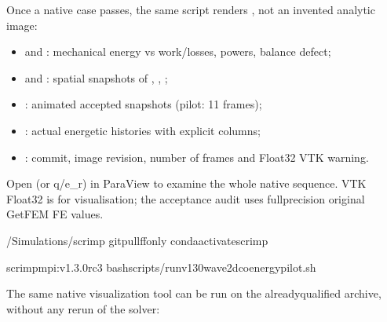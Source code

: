 \documentclass[letterpaper,10pt,english]{sphinxmanual}
\begin{document}
\sphinxAtStartPar
Once a native case passes, the same script renders
, not an invented
analytic image:
\begin{itemize}
\item {} 
\sphinxAtStartPar
{} and :
mechanical energy vs work/losses, powers, balance defect;

\item {} 
\sphinxAtStartPar
{} and :
spatial snapshots of , , ;

\item {} 
\sphinxAtStartPar
{}: animated accepted 
snapshots (pilot: 11 frames);

\item {} 
\sphinxAtStartPar
{}: actual energetic
histories with explicit columns;

\item {} 
\sphinxAtStartPar
{}: commit, image revision,
number of frames and Float32 VTK warning.

\end{itemize}

\sphinxAtStartPar
Open  (or q/e\_r) in
ParaView to examine the whole native sequence. VTK
Float32 is for visualisation; the acceptance audit
uses full\sphinxhyphen{}precision original GetFEM FE values.

\begin{sphinxVerbatim}[commandchars=\\\{\}]
\PYGZti{}/Simulations/scrimp
gitpull\PYGZhy{}\PYGZhy{}ff\PYGZhy{}only
condaactivatescrimp

scrimp\PYGZhy{}mpi:v1.3.0\PYGZhy{}rc3
bashscripts/run\PYGZhy{}v130\PYGZhy{}wave2d\PYGZhy{}coenergy\PYGZhy{}pilot.sh
\end{sphinxVerbatim}

\sphinxAtStartPar
The same native visualization tool can be run on
the already\sphinxhyphen{}qualified  archive, without any
rerun of the solver:
\end{document}
